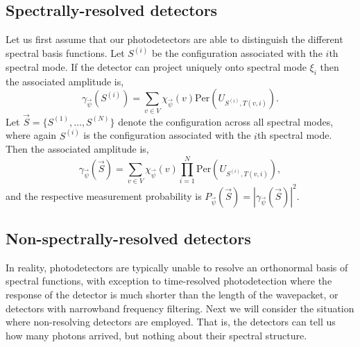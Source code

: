 \documentclass[aps,pra,twocolumn,amsmath,amssymb,nofootinbib,superscriptaddress]{revtex4}
\begin{document}
%
%

\subsection{Spectrally-resolved detectors}

Let us first assume that our photodetectors are able to distinguish the different spectral basis functions. Let $S^{(i)}$ be the configuration associated with the $i$th spectral mode. If the detector can project uniquely onto spectral mode $\xi_i$ then the associated amplitude is,
\begin{equation}
\gamma_{\vec\psi}(S^{(i)}) = \sum_{v\in V} \chi_{\vec\psi}(v) \mathrm{Per}\left(U_{S^{(i)},T(v,i)}\right).
\end{equation}
Let \mbox{$\vec{S}=\{S^{(1)},\dots,S^{(N)}\}$} denote the configuration across all spectral modes, where again $S^{(i)}$ is the configuration associated with the $i$th spectral mode. Then the associated amplitude is,
\begin{equation} \label{eq:general_gamma}
\gamma_{\vec\psi}(\vec{S}) = \sum_{v\in V} \chi_{\vec\psi}(v) \prod_{i=1}^N \mathrm{Per}\left(U_{S^{(i)},T(v,i)}\right),
\end{equation}
and the respective measurement probability is \mbox{$P_{\vec\psi}(\vec{S})=|\gamma_{\vec\psi}(\vec{S})|^2$}.

%
%

\subsection{Non-spectrally-resolved detectors}

In reality, photodetectors are typically unable to resolve an orthonormal basis of spectral functions, with exception to time-resolved photodetection where the response of the detector is much shorter than the length of the wavepacket, or detectors with narrowband frequency filtering. Next we will consider the situation where non-resolving detectors are employed. That is, the detectors can tell us how many photons arrived, but nothing about their spectral structure.
\end{document}

